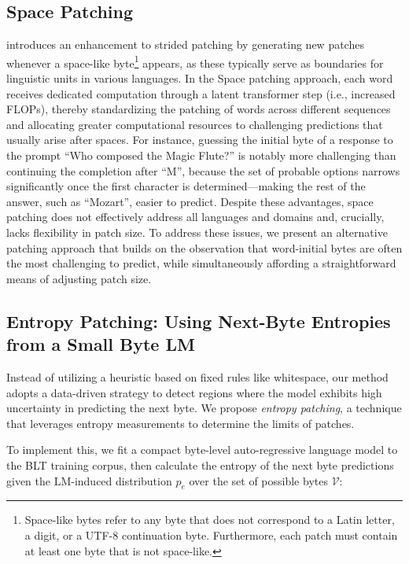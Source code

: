 \subsection{Space Patching}
\label{section:white-patch}

\citet{slagle2024spacebyte} introduces an enhancement to strided patching by generating new patches whenever a space-like byte\footnote{
    Space-like bytes refer to any byte that does not correspond to a Latin letter, a digit, or a UTF-8 continuation byte. Furthermore, each patch must contain at least one byte that is not space-like. } appears, as these typically serve as boundaries for linguistic units in various languages. In the Space patching approach, each word receives dedicated computation through a latent transformer step (i.e., increased FLOPs), thereby standardizing the patching of words across different sequences and allocating greater computational resources to challenging predictions that usually arise after spaces. For instance, guessing the initial byte of a response to the prompt ``Who composed the Magic Flute?\uline{\hspace{.6em}}'' is notably more challenging than continuing the completion after ``M'', because the set of probable options narrows significantly once the first character is determined—making the rest of the answer, such as ``Mozart'', easier to predict. Despite these advantages, space patching does not effectively address all languages and domains and, crucially, lacks flexibility in patch size. To address these issues, we present an alternative patching approach that builds on the observation that word-initial bytes are often the most challenging to predict, while simultaneously affording a straightforward means of adjusting patch size.

\subsection{Entropy Patching: Using Next-Byte Entropies from a Small Byte LM}
\label{section:dyn-patch}

Instead of utilizing a heuristic based on fixed rules like whitespace, our method adopts a data-driven strategy to detect regions where the model exhibits high uncertainty in predicting the next byte. We propose \textit{entropy patching}, a technique that leverages entropy measurements to determine the limits of patches.

To implement this, we fit a compact byte-level auto-regressive language model to the {\textsc BLT} training corpus, then calculate the entropy of the next byte predictions given the LM-induced distribution $p_{e}$ over the set of possible bytes $\mathcal{V}$:

